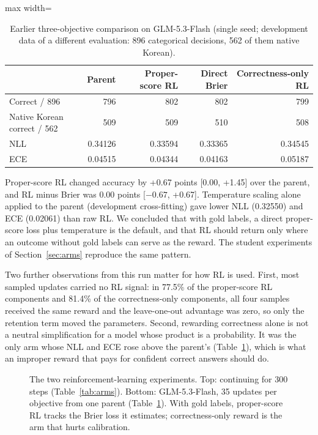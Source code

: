 \begin{table}[t]
\centering
\small
\caption{Earlier three-objective comparison on GLM-5.3-Flash (single seed; development data of
a different evaluation: 896 categorical decisions, 562 of them native Korean).}
\label{tab:glmrl}
\setlength{\tabcolsep}{4pt}
\begin{adjustbox}{max width=\linewidth}
\begin{tabular}{@{}lrrrr@{}}
\toprule
 & Parent & Proper-score RL & Direct Brier & Correctness-only RL \\
\midrule
Correct / 896 & 796 & 802 & 802 & 799 \\
Native Korean correct / 562 & 509 & 509 & 510 & 508 \\
NLL & 0.34126 & 0.33594 & 0.33365 & 0.34545 \\
ECE & 0.04515 & 0.04344 & 0.04163 & 0.05187 \\
\bottomrule
\end{tabular}
\end{adjustbox}
\end{table}

Proper-score RL changed accuracy by +0.67 points [0.00, +1.45] over the parent, and RL minus
Brier was 0.00 points [$-0.67$, +0.67]. Temperature scaling alone applied to the parent
(development cross-fitting) gave lower NLL (0.32550) and ECE (0.02061) than raw RL. We
concluded that with gold labels, a direct proper-score loss plus temperature is the default,
and that RL should return only where an outcome without gold labels can serve as the reward.
The student experiments of Section~\ref{sec:arms} reproduce the same pattern.

Two further observations from this run matter for how RL is used. First, most sampled
updates carried no RL signal: in 77.5\% of the proper-score RL components and 81.4\% of the
correctness-only components, all four samples received the same reward and the leave-one-out
advantage was zero,
so only the retention term moved the parameters. Second, rewarding correctness alone is not a
neutral simplification for a model whose product is a probability. It was the only arm whose
NLL and ECE rose above the parent's (Table~\ref{tab:glmrl}), which is what an improper reward
that pays for confident correct answers should do.

\begin{figure}[t]
\centering
{}
\caption{The two reinforcement-learning experiments. Top: continuing \expone{} for 300 steps
(Table~\ref{tab:arms}). Bottom: GLM-5.3-Flash, 35 updates per objective from one parent
(Table~\ref{tab:glmrl}). With gold labels, proper-score RL tracks the Brier loss it estimates;
correctness-only reward is the arm that hurts calibration.}
\label{fig:rl}
\end{figure}

